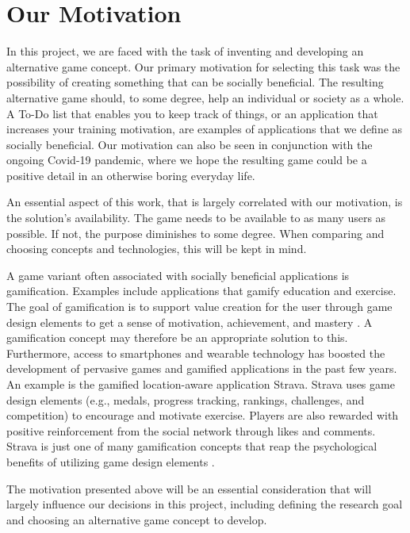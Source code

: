 \section{Our Motivation}
\label{chap:motivation}
In this project, we are faced with the task of inventing and developing an alternative game concept. Our primary motivation for selecting this task was the possibility of creating something that can be socially beneficial. The resulting alternative game should, to some degree, help an individual or society as a whole. A To-Do list that enables you to keep track of things, or an application that increases your training motivation, are examples of applications that we define as socially beneficial. Our motivation can also be seen in conjunction with the ongoing Covid-19 pandemic, where we hope the resulting game could be a positive detail in an otherwise boring everyday life.

An essential aspect of this work, that is largely correlated with our motivation, is the solution’s availability. The game needs to be available to as many users as possible. If not, the purpose diminishes to some degree. When comparing and choosing concepts and technologies, this will be kept in mind.

A game variant often associated with socially beneficial applications is gamification. Examples include applications that gamify education and exercise. The goal of gamification is to support value creation for the user through game design elements to get a sense of motivation, achievement, and mastery \citep{hamari_social_2013}. A gamification concept may therefore be an appropriate solution to this. Furthermore, access to smartphones and wearable technology has boosted the development of pervasive games and gamified applications in the past few years. An example is the gamified location-aware application Strava. Strava uses game design elements (e.g., medals, progress tracking, rankings, challenges, and competition) to encourage and motivate exercise. Players are also rewarded with positive reinforcement from the social network through likes and comments. Strava is just one of many gamification concepts that reap the psychological benefits of utilizing game design elements \citep{sailer_how_2017}.

The motivation presented above will be an essential consideration that will largely influence our decisions in this project, including defining the research goal and choosing an alternative game concept to develop.

